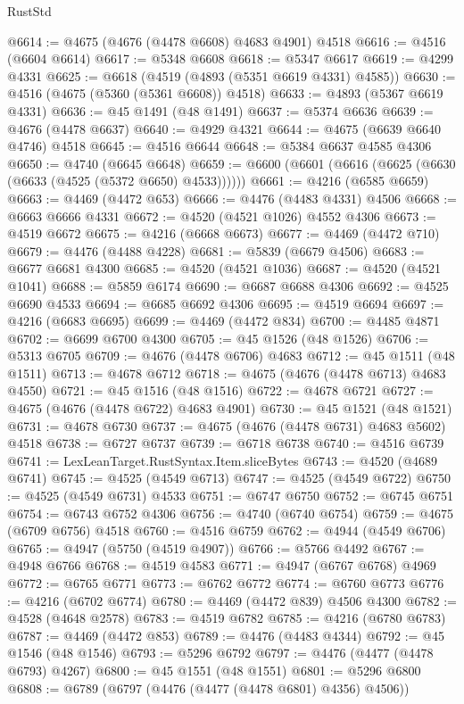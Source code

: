 \begin{lexlean}{RustStd}
\begin{coremodule}
@6614 := @4675 (@4676 (@4478 @6608) @4683 @4901) @4518
@6616 := @4516 (@6604 @6614)
@6617 := @5348 @6608
@6618 := @5347 @6617
@6619 := @4299 @4331
@6625 := @6618 (@4519 (@4893 (@5351 @6619 @4331) @4585))
@6630 := @4516 (@4675 (@5360 (@5361 @6608)) @4518)
@6633 := @4893 (@5367 @6619 @4331)
@6636 := @45 @1491 (@48 @1491)
@6637 := @5374 @6636
@6639 := @4676 (@4478 @6637)
@6640 := @4929 @4321
@6644 := @4675 (@6639 @6640 @4746) @4518
@6645 := @4516 @6644
@6648 := @5384 @6637 @4585 @4306
@6650 := @4740 (@6645 @6648)
@6659 := @6600 (@6601 (@6616 (@6625 (@6630 (@6633 (@4525 (@5372 @6650) @4533))))))
@6661 := @4216 (@6585 @6659)
@6663 := @4469 (@4472 @653)
@6666 := @4476 (@4483 @4331) @4506
@6668 := @6663 @6666 @4331
@6672 := @4520 (@4521 @1026) @4552 @4306
@6673 := @4519 @6672
@6675 := @4216 (@6668 @6673)
@6677 := @4469 (@4472 @710)
@6679 := @4476 (@4488 @4228)
@6681 := @5839 (@6679 @4506)
@6683 := @6677 @6681 @4300
@6685 := @4520 (@4521 @1036)
@6687 := @4520 (@4521 @1041)
@6688 := @5859 @6174
@6690 := @6687 @6688 @4306
@6692 := @4525 @6690 @4533
@6694 := @6685 @6692 @4306
@6695 := @4519 @6694
@6697 := @4216 (@6683 @6695)
@6699 := @4469 (@4472 @834)
@6700 := @4485 @4871
@6702 := @6699 @6700 @4300
@6705 := @45 @1526 (@48 @1526)
@6706 := @5313 @6705
@6709 := @4676 (@4478 @6706) @4683
@6712 := @45 @1511 (@48 @1511)
@6713 := @4678 @6712
@6718 := @4675 (@4676 (@4478 @6713) @4683 @4550)
@6721 := @45 @1516 (@48 @1516)
@6722 := @4678 @6721
@6727 := @4675 (@4676 (@4478 @6722) @4683 @4901)
@6730 := @45 @1521 (@48 @1521)
@6731 := @4678 @6730
@6737 := @4675 (@4676 (@4478 @6731) @4683 @5602) @4518
@6738 := @6727 @6737
@6739 := @6718 @6738
@6740 := @4516 @6739
@6741 := LexLeanTarget.RustSyntax.Item.sliceBytes
@6743 := @4520 (@4689 @6741)
@6745 := @4525 (@4549 @6713)
@6747 := @4525 (@4549 @6722)
@6750 := @4525 (@4549 @6731) @4533
@6751 := @6747 @6750
@6752 := @6745 @6751
@6754 := @6743 @6752 @4306
@6756 := @4740 (@6740 @6754)
@6759 := @4675 (@6709 @6756) @4518
@6760 := @4516 @6759
@6762 := @4944 (@4549 @6706)
@6765 := @4947 (@5750 (@4519 @4907))
@6766 := @5766 @4492
@6767 := @4948 @6766
@6768 := @4519 @4583
@6771 := @4947 (@6767 @6768) @4969
@6772 := @6765 @6771
@6773 := @6762 @6772
@6774 := @6760 @6773
@6776 := @4216 (@6702 @6774)
@6780 := @4469 (@4472 @839) @4506 @4300
@6782 := @4528 (@4648 @2578)
@6783 := @4519 @6782
@6785 := @4216 (@6780 @6783)
@6787 := @4469 (@4472 @853)
@6789 := @4476 (@4483 @4344)
@6792 := @45 @1546 (@48 @1546)
@6793 := @5296 @6792
@6797 := @4476 (@4477 (@4478 @6793) @4267)
@6800 := @45 @1551 (@48 @1551)
@6801 := @5296 @6800
@6808 := @6789 (@6797 (@4476 (@4477 (@4478 @6801) @4356) @4506))

\end{coremodule}
\end{lexlean}
